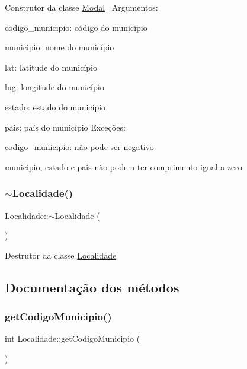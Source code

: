 Construtor da classe \hyperlink{classModal}{Modal}~\newline
Argumentos\+:
\begin{DoxyItemize}
\item codigo\+\_\+municipio\+: código do município
\item municipio\+: nome do município
\item lat\+: latitude do município
\item lng\+: longitude do município
\item estado\+: estado do município
\item pais\+: país do município Exceções\+:
\end{DoxyItemize}

codigo\+\_\+municipio\+: não pode ser negativo
\begin{DoxyItemize}
\item municipio, estado e pais não podem ter comprimento igual a zero
\end{DoxyItemize}\mbox{\label{classLocalidade_ab4bdecea35fe8bd89b67b6d505b8bae1}} 
\subsubsection{\texorpdfstring{$\sim$\+Localidade()}{~Localidade()}}
{\footnotesize\ttfamily Localidade\+::$\sim$\+Localidade (\begin{DoxyParamCaption}{ }\end{DoxyParamCaption})}

Destrutor da classe \hyperlink{classLocalidade}{Localidade}

\subsection{Documentação dos métodos}
\mbox{\label{classLocalidade_af83a061d36464f5d91fefa5b68206112}} 
\subsubsection{\texorpdfstring{get\+Codigo\+Municipio()}{getCodigoMunicipio()}}
{\footnotesize\ttfamily int Localidade\+::get\+Codigo\+Municipio (\begin{DoxyParamCaption}{ }\end{DoxyParamCaption})}

